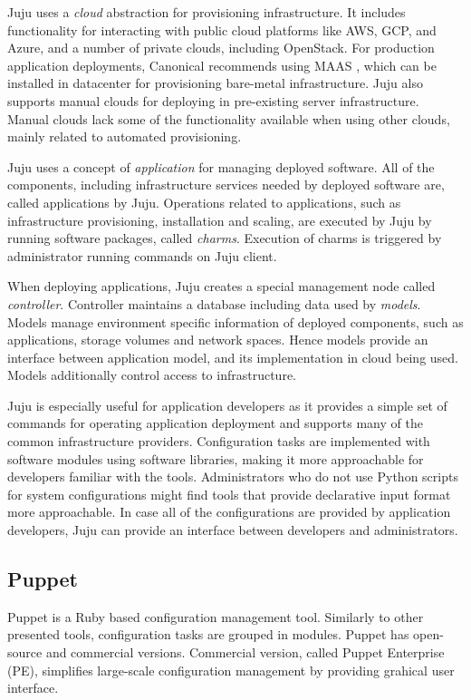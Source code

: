 Juju uses a \textit{cloud} abstraction for provisioning infrastructure. It
includes functionality for interacting with public cloud platforms like AWS,
GCP, and Azure, and a number of private clouds, including OpenStack. For
production application deployments, Canonical recommends using MAAS
\cite{sirbu2015maas}, which can be installed in datacenter for provisioning
bare-metal infrastructure. Juju also supports manual clouds for deploying in
pre-existing server infrastructure. Manual clouds lack some of the
functionality available when using other clouds, mainly related to automated
provisioning.

Juju uses a concept of \textit{application} for managing deployed software. All
of the components, including infrastructure services needed by deployed
software are, called applications by Juju. Operations related to applications,
such as infrastructure provisioning, installation and scaling, are executed by
Juju by running software packages, called \textit{charms}. Execution of charms
is triggered by administrator running commands on Juju client.

When deploying applications, Juju creates a special management node called
\textit{controller}. Controller maintains a database including data used by
\textit{models}. Models manage environment specific information of deployed
components, such as applications, storage volumes and network spaces. Hence
models provide an interface between application model, and its implementation
in cloud being used. Models additionally control access to infrastructure.

Juju is especially useful for application developers as it provides a simple
set of commands for operating application deployment and supports many of the
common infrastructure providers. Configuration tasks are implemented with
software modules using software libraries, making it more approachable for
developers familiar with the tools. Administrators who do not use Python
scripts for system configurations might find tools that provide declarative
input format more approachable. In case all of the configurations are provided
by application developers, Juju can provide an interface between developers and
administrators.

\subsection{Puppet}

Puppet \cite{puppet} is a Ruby based configuration management tool. Similarly
to other presented tools, configuration tasks are grouped in modules. Puppet
has open-source and commercial versions. Commercial version, called Puppet
Enterprise (PE), simplifies large-scale configuration management by providing
grahical user interface.

